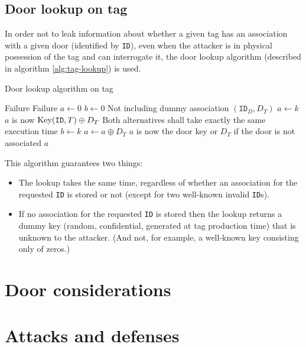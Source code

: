 \documentclass[a4paper,10pt]{scrartcl}
\begin{document}
\subsection{Door lookup on tag} \label{sec:tag-lookup}
In order not to leak information about whether a given tag has an association with a given door (identified by \texttt{ID}), even when the attacker is in physical possession of the tag and can interrogate it, the door lookup algorithm (described in algorithm \ref{alg:tag-lookup}) is used.
\begin{algorithm}
  \centering \caption{Door lookup algorithm on tag} \label{alg:tag-lookup}
  \begin{algorithmic}
        \State \Return Failure
      \EndIf
        \State \Return Failure
      \EndIf
      \State $a \gets 0$
      \State $b \gets 0$
       \Comment Not including dummy association $(\texttt{ID}_D, D_T)$
          \State $a \gets k$ \Comment $a$ is now $\textnormal{Key}(\texttt{ID},T) \oplus D_T$
        \Else \Comment Both alternatives shall take exactly the same execution time
          \State $b \gets k$
        \EndIf
      \EndFor
      \State $a \gets a \oplus D_T$ \Comment $a$ is now the door key or $D_T$ if the door is not associated
      \State \Return $a$
    \EndFunction
  \end{algorithmic}
\end{algorithm}

This algorithm guarantees two things: \begin{itemize}
  \item The lookup takes the same time, regardless of whether an association for the requested \texttt{ID} is stored or not (except for two well-known invalid \texttt{ID}s).
  \item If no association for the requested \texttt{ID} is stored then the lookup returns a dummy key (random, confidential, generated at tag production time) that is unknown to the attacker. (And not, for example, a well-known key consisting only of zeros.)
\end{itemize}

 
\section{Door considerations}

\section{Attacks and defenses}
\end{document}
